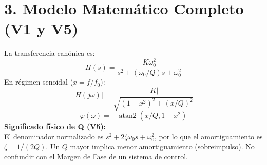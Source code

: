 \documentclass[10pt, a4paper]{article}
\begin{document}
\section*{3. Modelo Matemático Completo (V1 y V5)}
\begin{minipage}{0.48\textwidth}
    La transferencia canónica es:
    \begin{equation}
        H(s) = \frac{K\omega_0^2}{s^2+(\omega_0/Q)s+\omega_0^2}
    \end{equation}
    En régimen senoidal ($x = f/f_0$):
    \begin{equation}
        |H(j\omega)| = \frac{|K|}{\sqrt{(1-x^2)^2+(x/Q)^2}}
    \end{equation}
    \begin{equation}
        \varphi(\omega) = -\operatorname{atan2}(x/Q, 1-x^2)
    \end{equation}
    \textbf{Significado físico de Q (V5):}\\
    El denominador normalizado es $s^2 + 2\zeta\omega_0 s + \omega_0^2$, por lo que el amortiguamiento es $\zeta = 1/(2Q)$. Un $Q$ mayor implica menor amortiguamiento (sobreimpulso). No confundir con el Margen de Fase de un sistema de control.
\end{minipage}
\hfill
\begin{minipage}{0.48\textwidth}
    \begin{center}
    \end{center}
\end{minipage}
\end{document}
